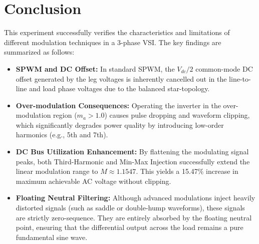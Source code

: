 \documentclass{article}
\begin{document}
\section*{Conclusion}
This experiment successfully verifies the characteristics and limitations of different modulation techniques in a 3-phase VSI. The key findings are summarized as follows:
\begin{itemize}
    \item \textbf{SPWM and DC Offset:} In standard SPWM, the $V_{dc}/2$ common-mode DC offset generated by the leg voltages is inherently cancelled out in the line-to-line and load phase voltages due to the balanced star-topology.
\end{itemize}
\begin{itemize}
    \item \textbf{Over-modulation Consequences:} Operating the inverter in the over-modulation region ($m_a > 1.0$) causes pulse dropping and waveform clipping, which significantly degrades power quality by introducing low-order harmonics (e.g., 5th and 7th).
\end{itemize}
\begin{itemize}
\item \textbf{DC Bus Utilization Enhancement:} By flattening the modulating signal peaks, both Third-Harmonic and Min-Max Injection successfully extend the linear modulation range to $M \approx 1.1547$. This yields a 15.47\% increase in maximum achievable AC voltage without clipping.
\end{itemize}
\begin{itemize}
    \item \textbf{Floating Neutral Filtering:} Although advanced modulations inject heavily distorted signals (such as saddle or double-hump waveforms), these signals are strictly zero-sequence. They are entirely absorbed by the floating neutral point, ensuring that the differential output across the load remains a pure fundamental sine wave.
\end{itemize}
\end{document}
